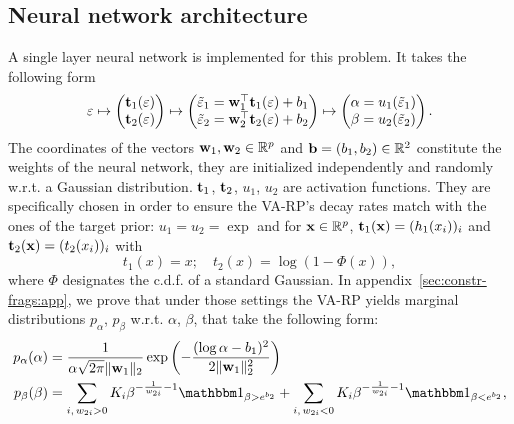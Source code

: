 \subsection{Neural network architecture}\label{sec:constr-frags:architecture}


A single layer neural network is implemented for this problem. It takes the following form
\begin{equation}\label{eq:neuralnet-architecture}
    \varepsilon \mapsto \begin{pmatrix}
        \mathbf{t}_1(\varepsilon)\\ \mathbf{t}_2(\varepsilon) 
    \end{pmatrix} \mapsto
    \begin{pmatrix}
        \tilde{\varepsilon}_1 = \mathbf{w}_1^\top\mathbf{t}_1(\varepsilon) + b_1 \\
        \tilde{\varepsilon}_2 = \mathbf{w}_2^\top\mathbf{t}_2(\varepsilon)+b_2 
    \end{pmatrix} \mapsto
    \begin{pmatrix}
        \alpha = u_1(\tilde{\varepsilon}_1)\\
        \beta = u_2(\tilde{\varepsilon}_2)
    \end{pmatrix}.
\end{equation}
The coordinates of the vectors $\mathbf{w}_1,\mathbf{w}_2\in\mathbb{R}^p$ and $\mathbf{b}=(b_1,b_2)\in\mathbb{R}^2$ constitute the weights of the neural network, they are initialized independently and randomly w.r.t. a Gaussian distribution. $\mathbf{t}_1$, $\mathbf{t}_2$, $u_1$, $u_2$ are activation functions.
They are specifically chosen in order to ensure the VA-RP's decay rates match with the ones of the target prior: $u_1=u_2=\exp$ and for $\mathbf{x}\in\mathbb{R}^p$, $\mathbf{t}_1(\mathbf{x})=(h_1(x_i))_i$ and $\mathbf{t}_2(\mathbf{x})=(t_2(x_i))_i$ with
\begin{equation}
    t_1(x) = x;\quad t_2(x) = \log(1-\Phi(x)),
\end{equation}
where $\Phi$ designates the c.d.f. of a standard Gaussian.
In appendix~\ref{sec:constr-frags:app}, we prove that under those settings the VA-RP yields marginal distributions $ p_\alpha$, $p_\beta$ w.r.t. $\alpha$, $\beta$, that take the following form:
    \begin{equation}
        \begin{aligned}
        p_\alpha(\alpha) &= \frac{1}{\alpha\sqrt{2\pi}\|\mbf w_1 \|_2}\exp\left(-\frac{(\log\alpha - b_1)^2}{2\|\mbf w_1\|^2_2}\right) \\
        p_\beta(\beta) &= \sum_{i,\, w_{2i}>0}{K_i}\beta^{-\frac{1}{w_{2i}}-1}\indic_{\beta>e^{b_2}} + \sum_{i,\, w_{2i}<0}K_i\beta^{-\frac{1}{w_{2i}}-1}\indic_{\beta<e^{b_2}},
    \end{aligned}
    \label{eq:marginaldist}
    \end{equation}
